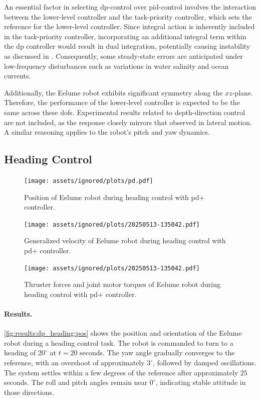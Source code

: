 An essential factor in selecting \gls{dp}-control over \gls{pid}-control involves the interaction between the lower-level controller and the task-priority controller, which sets the reference for the lower-level controller. Since integral action is inherently included in the task-priority controller, incorporating an additional integral term within the \gls{dp} controller would result in dual integration, potentially causing instability as discussed in \cite{fossen2021}. Consequently, some steady-state errors are anticipated under low-frequency disturbances such as variations in water salinity and ocean currents.

Additionally, the Eelume robot exhibits significant symmetry along the $xz$-plane. Therefore, the performance of the lower-level controller is expected to be the same across these \glspl{dof}. Experimental results related to depth-direction control are not included, as the response closely mirrors that observed in lateral motion. A similar reasoning applies to the robot’s pitch and yaw dynamics.

\subsection{Heading Control}

\begin{figure}[!ht]
    \centering
    \texttt{[image: assets/ignored/plots/pd.pdf]}
    \caption{Position of Eelume robot during heading control with \gls{pd+} controller.}
    \label{fig:results:dp_heading:pos}
\end{figure}
\begin{figure}[!ht]
    \centering
    \texttt{[image: assets/ignored/plots/20250513-135042.pdf]}
    \caption{Generalized velocity of Eelume robot during heading control with \gls{pd+} controller.}
    \label{fig:results:dp_heading:vel}
\end{figure}
\begin{figure}[!ht]
    \centering
    \texttt{[image: assets/ignored/plots/20250513-135042.pdf]}
    \caption{Thruster forces and joint motor torques of Eelume robot during heading control with \gls{pd+} controller.}
    \label{fig:results:dp_heading:forces2}
\end{figure}

\paragraph{Results.}
\autoref{fig:results:dp_heading:pos} shows the position and orientation of the 
Eelume robot during a heading control task. The robot is commanded to turn to 
a heading of \(20^\circ\) at \(t = 20\) seconds. The yaw angle gradually 
converges to the reference, with an overshoot of approximately \(3^\circ\), 
followed by damped oscillations. The system settles within a few degrees of 
the reference after approximately \(25\) seconds. The roll and pitch angles 
remain near \(0^\circ\), indicating stable attitude in those directions.

